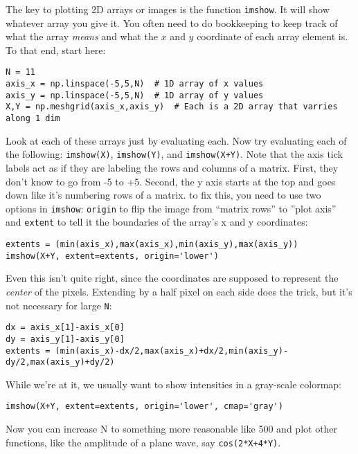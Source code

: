 \documentclass[11pt]{hmcpset}
\begin{document}
\begin{solution}
	
	\vfill
	
\end{solution}
	\pagebreak
	\begin{problem}
		The key to plotting 2D arrays or images is the function \texttt{imshow}. It will show whatever array you give it. You often need to do bookkeeping to keep track of what the array \textit{means} and what the $x$ and $y$ coordinate of each array element is. To that end, start here:
\begin{lstlisting}[style=Python]
N = 11
axis_x = np.linspace(-5,5,N)  # 1D array of x values
axis_y = np.linspace(-5,5,N)  # 1D array of y values
X,Y = np.meshgrid(axis_x,axis_y)  # Each is a 2D array that varries along 1 dim
\end{lstlisting}
	Look at each of these arrays just by evaluating each. Now try evaluating each of the following: \texttt{imshow(X)}, \texttt{imshow(Y)}, and \texttt{imshow(X+Y)}. Note that the axis tick labels act as if they are labeling the rows and columns of a matrix. First, they don't know to go from -5 to +5. Second, the y axis starts at the top and goes down like it's numbering rows of a matrix. to fix this, you need to use two options in \texttt{imshow}: \texttt{origin} to flip the image from ``matrix rows'' to ''plot axis'' and \texttt{extent} to tell it the boundaries of the array's x and y coordinates:
\begin{lstlisting}[style=Python]
extents = (min(axis_x),max(axis_x),min(axis_y),max(axis_y))
imshow(X+Y, extent=extents, origin='lower')
\end{lstlisting}
	Even this isn't quite right, since the coordinates are supposed to represent the \textit{center} of the pixels. Extending by a half pixel on each side does the trick, but it's not necessary for large \texttt{N}:
\begin{lstlisting}[style=Python]
dx = axis_x[1]-axis_x[0]
dy = axis_y[1]-axis_y[0]
extents = (min(axis_x)-dx/2,max(axis_x)+dx/2,min(axis_y)-dy/2,max(axis_y)+dy/2)
\end{lstlisting}
While we're at it, we usually want to show intensities in a gray-scale colormap:
\begin{lstlisting}[style=Python]
imshow(X+Y, extent=extents, origin='lower', cmap='gray')
\end{lstlisting}
	Now you can increase N to something more reasonable like 500 and plot other functions, like the amplitude of a plane wave, say \texttt{cos(2*X+4*Y)}.
	

\end{problem}
\end{document}
